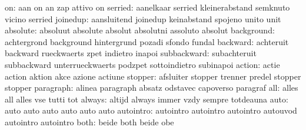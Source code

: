                        on: aan                       on
                           an                        zap
                           attivo                    on
                  serried: aanelkaar                 serried
                           kleinerabstand            semknuto
                           vicino                    serried
                 joinedup: aansluitend               joinedup
                           keinabstand               spojeno
                           unito                     unit
                 absolute: absoluut                  absolute
                           absolut                   absolutni
                           assoluto                  absolut
               background: achtergrond               background
                           hintergrund               pozadi
                           sfondo                    fundal
                 backward: achteruit                 backward
                           rueckwaerts               zpet
                           indietro                  inapoi
              subbackward: subachteruit              subbackward
                           unterrueckwaerts          podzpet
                           sottoindietro             subinapoi
                   action: actie                     action
                           aktion                    akce
                           azione                    actiune
                  stopper: afsluiter                 stopper
                           trenner                   predel
                           stopper                   stopper
                paragraph: alinea                    paragraph
                           absatz                    odstavec
                           capoverso                 paragraf
                      all: alles                     all
                           alles                     vse
                           tutti                     tot
                   always: altijd                    always
                           immer                     vzdy
                           sempre                    totdeauna
                     auto: auto                      auto
                           auto                      auto
                           auto                      auto
                autointro: autointro                 autointro
                           autointro                 autouvod
                           autointro                 autointro
                     both: beide                     both
                           beide                     obe
